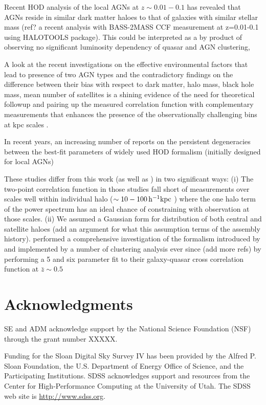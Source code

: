 \documentclass[useAMS,usenatbib]{mn2e}
\begin{document}
Recent HOD analysis of the local AGNs at $z \sim 0.01-0.1$ has revealed that 
AGNs reside in similar dark matter haloes to that of galaxies with similar 
stellar mass (ref? a recent analysis with BASS-2MASS CCF measurement at 
z=0.01-0.1 using HALOTOOLS package). 
This could be interpreted as a by product of observing no significant luminosity 
dependency of quasar and AGN clustering,  

A look at the recent investigations on the effective environmental factors that 
lead to presence of two AGN types and the contradictory findings on the 
difference between their bias with respect to dark matter, halo mass, black hole 
mass, mean number of satellites \citep[see, e.g.,][]{Dip14CMB,Dip17a,kr18} is a 
shining evidence of the need for theoretical followup and pairing up the 
measured correlation function with complementary measurements that enhances the 
presence of the observationally challenging bins at kpc scales \citep[see, ][for 
a proposed alternative]{sta11}.

In recent years, an increasing number of reports on the persistent degeneracies 
between the best-fit parameters of widely used HOD formalism (initially 
designed for local AGNs) 

 These studies differ from this work (as well as \citep{ko12}) in two 
significant ways: (i) The two-point correlation function in those studies fall 
short of measurements over scales well within individual halo ($\sim 10-100 \, 
\rm h^{-1} kpc$ ) where the one halo term of the power spectrum has an ideal 
chance of constraining with observation at those scales. (ii) We assumed a 
Gaussian form for distribution of both central and satellite haloes (add an 
argument for what this assumption terms of the assembly history). \citet{sh13} 
performed a comprehensive investigation of the formalism introduced by 
\citet{zh05} and implemented by a number of clustering analysis ever since 
\citep{zh07,mi11,zeh11,ric12,ric13}(add more refs) by performing a 5 and six 
parameter fit to their galaxy-quasar cross correlation function at $\bar z \sim 
0.5$  
 
\section*{Acknowledgments}
SE and ADM acknowledge support by the National Science Foundation (NSF) through the 
grant number XXXXX. 

Funding for the Sloan Digital Sky Survey IV has been provided by the Alfred P. 
Sloan Foundation, the U.S. Department of Energy Office of Science, and the 
Participating Institutions. SDSS acknowledges support and resources from the 
Center for High-Performance Computing at the University of Utah. The SDSS web 
site is \url{http://www.sdss.org}.
\end{document}
